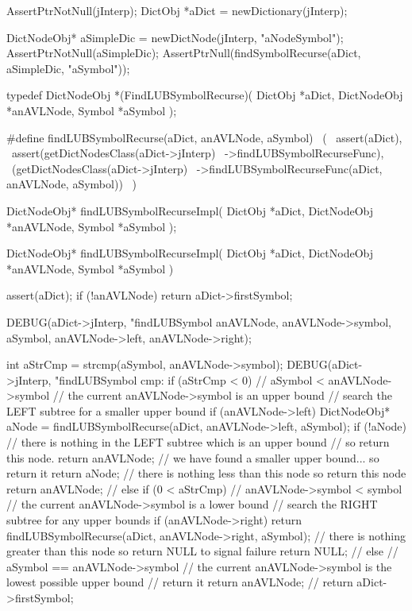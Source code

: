 \startCTest
  AssertPtrNotNull(jInterp);
  DictObj *aDict = newDictionary(jInterp);

  DictNodeObj* aSimpleDic = newDictNode(jInterp, "aNodeSymbol");
  AssertPtrNotNull(aSimpleDic);
  AssertPtrNull(findSymbolRecurse(aDict, aSimpleDic, "aSymbol"));
\stopCTest
\stopTestCase
\stopTestSuite

\startTestSuite[findLUBSymbolRecurse]

\startCHeader
typedef DictNodeObj *(FindLUBSymbolRecurse)(
  DictObj     *aDict,
  DictNodeObj *anAVLNode,
  Symbol      *aSymbol
);

#define findLUBSymbolRecurse(aDict, anAVLNode, aSymbol)       \
  (                                                           \
    assert(aDict),                                            \
    assert(getDictNodesClass(aDict->jInterp)                  \
      ->findLUBSymbolRecurseFunc),                            \
    (getDictNodesClass(aDict->jInterp)                        \
      ->findLUBSymbolRecurseFunc(aDict, anAVLNode, aSymbol))  \
  )
\stopCHeader

\setCHeaderStream{private}
\startCHeader
DictNodeObj* findLUBSymbolRecurseImpl(
  DictObj     *aDict,
  DictNodeObj *anAVLNode,
  Symbol      *aSymbol
);
\stopCHeader
{}

\startCCode
DictNodeObj* findLUBSymbolRecurseImpl(
  DictObj     *aDict,
  DictNodeObj *anAVLNode,
  Symbol      *aSymbol
) {
  assert(aDict);
  if (!anAVLNode) return aDict->firstSymbol;

  DEBUG(aDict->jInterp,
        "findLUBSymbol %
        anAVLNode, anAVLNode->symbol, aSymbol,
        anAVLNode->left, anAVLNode->right);

  int aStrCmp = strcmp(aSymbol, anAVLNode->symbol);
  DEBUG(aDict->jInterp, "findLUBSymbol cmp: %
  if (aStrCmp < 0) {
    // aSymbol < anAVLNode->symbol
    // the current anAVLNode->symbol is an upper bound
    // search the LEFT subtree for a smaller upper bound
    if (anAVLNode->left) {
      DictNodeObj* aNode = findLUBSymbolRecurse(aDict, anAVLNode->left, aSymbol);
      if (!aNode) {
        // there is nothing in the LEFT subtree which is an upper bound
        // so return this node.
        return anAVLNode;
      }
      // we have found a smaller upper bound... so return it
      return aNode;
    }
    // there is nothing less than this node so return this node
    return anAVLNode;
    //
  } else if (0 < aStrCmp) {
    // anAVLNode->symbol < symbol
    // the current anAVLNode->symbol is a lower bound
    // search the RIGHT subtree for any upper bounds
    if (anAVLNode->right) {
      return findLUBSymbolRecurse(aDict, anAVLNode->right, aSymbol);
    }
    // there is nothing greater than this node so return NULL to signal failure
    return NULL;
    //
  } else {
    // aSymbol == anAVLNode->symbol
    // the current anAVLNode->symbol is the lowest possible upper bound
    // return it
    return anAVLNode;
    //
  }
  return aDict->firstSymbol;
}
\stopCCode
\stopTestSuite
